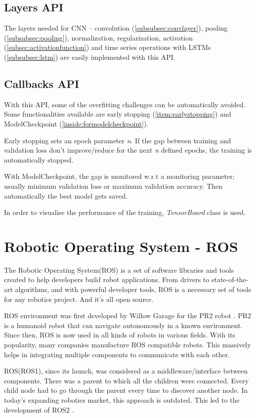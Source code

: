 \subsection{Layers API}
The layers needed for CNN -- convolution (\ref{subsubsec:convlayer}), pooling
(\ref{subsubsec:pooling}), normalization, regularization,
activation (\ref{subsec:activationfunction}) and time series operations with LSTMs
(\ref{subsubsec:lstm}) are easily implemented with this API.

\subsection{Callbacks API}
With this API, some of the overfitting challenges can be automatically avoided.
Some functionalities available are early stopping (\ref{item:earlystopping}) and
ModelCheckpoint (\ref{inside:formodelcheckpoint}).

Early stopping sets an epoch parameter \textit{n}. If the gap between training and validation loss
don't improve/reduce for the next \textit{n} defined epochs, the training is automatically
stopped.

With ModelCheckpoint, the gap is monitored w.r.t a monitoring parameter; usually minimum validation
loss or maximum validation accuracy. Then automatically the best model gets saved.

In order to visualise the performance of the training, \textit{TensorBoard} class is used.

\section{Robotic Operating System - ROS}
The Robotic Operating System(ROS) \cite{aboutros} is a set of software libraries and tools created to help
developers build robot applications. From drivers to state-of-the-art algorithms, and with powerful developer tools, ROS is a necessary set of tools for any robotics project. And it’s all open source.

ROS environment was first developed by Willow Garage for the PR2 robot \cite{firstros}. PR2 is a humanoid robot that can navigate autonomously in a known environment.
Since then, ROS is now used in all kinds of robots in various fields. With its popularity,
many companies manufacture ROS compatible robots. This massively helps in integrating
multiple components to communicate with each other.

ROS(ROS1), since its launch, was considered as a middleware/interface between components. There was a
parent to which all the children were connected. Every child node had to go through the
parent every time to discover another node.  In today's expanding robotics market,
this approach is outdated. This led to the development of ROS2 \cite{whyros2}.
